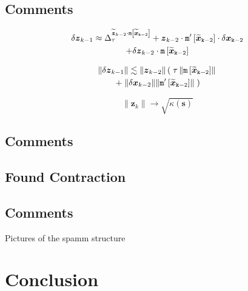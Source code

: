 \documentclass[letterpaper,twocolumn,amsmath,amsfont,amssymb,english,aps,jcp,preprintnumbers,groupaddress,nofootinbib,tightenlines]{revtex4}
\newcommand{\mat}[1]{\boldsymbol{#1}}
\begin{document}
\subsection{Comments}

\begin{multline}
 \delta {\mat{z}}_{k-1} \approx \Delta^{\widetilde{\mat{z}}_{k-2} \cdot \tt{m}\left[ \widetilde{\mat{x}}_{k-2}\right]}_\tau 
+ \mat{z}_{k-2} \cdot \tt{m}'\left[ \widetilde{\mat{x}}_{k-2}\right] \cdot \delta \mat{x}_{k-2} \\
+\delta \mat{z}_{k-2} \cdot \tt{m} \left[\widetilde{\mat{x}}_{k-2} \right] 
\end{multline}

\begin{multline}
\lVert \delta {\mat{z}}_{k-1} \rVert \lesssim
\lVert \mat{z}_{k-2} \rVert \left( \;  \tau \, \lVert \tt{m} \left[\widetilde{\mat{x}}_{k-2} \right]  \rVert \right.   \\ \left.
+ \; \lVert \delta {\mat{x}}_{k-2} \rVert   \lVert \tt{m}' \left[\widetilde{\mat{x}}_{k-2} \right] \rVert \; \right)
\end{multline}

\begin{equation}
\lVert \mat{z}_{k} \rVert  \rightarrow \sqrt{\kappa\left(\mat{s} \right)}
\end{equation}






\subsection{Comments}

\subsection{Found Contraction}

\subsection{Comments}
Pictures of the spamm structure

\section{Conclusion}



\end{document}
